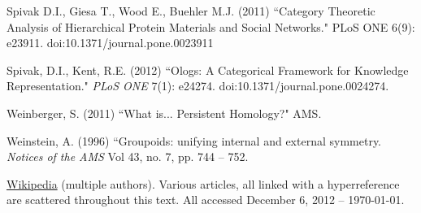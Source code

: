 \documentclass{book}
\theoremstyle{remark}
\theoremstyle{definition}
\begin{document}
\begin{thebibliography}{SGWB}
 Spivak D.I., Giesa T., Wood E., Buehler M.J. (2011) ``Category Theoretic Analysis of Hierarchical Protein Materials and Social Networks." PLoS ONE 6(9): e23911. doi:10.1371/journal.pone.0023911

 Spivak, D.I., Kent, R.E. (2012) ``Ologs: A Categorical Framework for Knowledge Representation." {\em PLoS ONE} 7(1): e24274. doi:10.1371/journal.pone.0024274.

 Weinberger, S. (2011) ``What is... Persistent Homology?" AMS.

 Weinstein, A. (1996) ``Groupoids: unifying internal and external symmetry. {\em Notices of the AMS} Vol 43, no. 7, pp. 744 -- 752.

 \href{http://www.wikipedia.org}{\text Wikipedia} (multiple authors). Various articles, all linked with a hyperreference are scattered throughout this text. All accessed December 6, 2012 -- \today.

\end{thebibliography}
\end{document}
